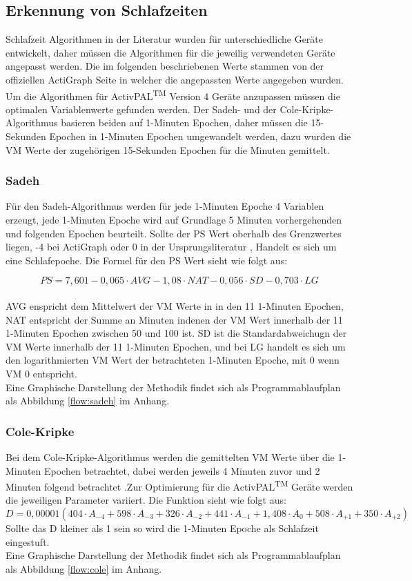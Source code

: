 \subsection{Erkennung von Schlafzeiten}
Schlafzeit Algorithmen in der Literatur wurden für unterschiedliche Geräte 
entwickelt, daher müssen die Algorithmen für die jeweilig verwendeten Geräte angepasst werden. Die im folgenden beschriebenen Werte stammen von der offiziellen ActiGraph Seite in welcher die angepassten Werte angegeben wurden. Um die Algorithmen für ActivPAL\textsuperscript{TM} Version 4 Geräte anzupassen müssen die optimalen Variablenwerte gefunden werden. Der Sadeh- und der Cole-Kripke-Algorithmus basieren beiden auf 1-Minuten Epochen, daher müssen die 15-Sekunden Epochen in 1-Minuten Epochen umgewandelt werden, dazu wurden die \ac{VM} Werte der zugehörigen 15-Sekunden Epochen für die Minuten gemittelt.



\subsubsection{Sadeh}
Für den Sadeh-Algorithmus werden für jede 1-Minuten Epoche 4 Variablen erzeugt, jede 1-Minuten Epoche wird auf Grundlage 5 Minuten vorhergehenden und folgenden Epochen beurteilt.
Sollte der \ac{PS} Wert oberhalb des Grenzwertes liegen, -4 bei ActiGraph oder 0 in der Ursprungsliteratur \cite{sadeh1994},  Handelt es sich um eine Schlafepoche. Die Formel für den \ac{PS} Wert sieht wie folgt aus:

$$ PS = 7,601 -  0,065 \cdot AVG - 1,08 \cdot NAT - 0,056 \cdot SD - 0,703 \cdot LG$$
\\
AVG enspricht dem Mittelwert der \ac{VM} Werte in in den 11 1-Minuten Epochen, NAT entspricht der Summe an Minuten indenen der \ac{VM} Wert innerhalb der 11 1-Minuten Epochen zwischen 50 und 100 ist. SD ist die Standardabweichugn der \ac{VM} Werte innerhalb der 11 1-Minuten Epochen, und bei LG handelt es sich um den logarithmierten \ac{VM} Wert der betrachteten 1-Minuten Epoche, mit 0 wenn \ac{VM} 0 entspricht.\\
Eine Graphische Darstellung der Methodik findet sich als Programmablaufplan als Abbildung \ref{flow:sadeh} im Anhang.



\subsubsection{Cole-Kripke}
Bei dem Cole-Kripke-Algorithmus werden die gemittelten \ac{VM} Werte über die 1-Minuten Epochen betrachtet, dabei werden jeweils 4 Minuten zuvor und 2 Minuten folgend betrachtet \cite{cole1992}.Zur Optimierung für die ActivPAL\textsuperscript{TM} Geräte werden die jeweiligen Parameter variiert. Die Funktion sieht wie folgt aus:
$$ D = 0,00001 (404 \cdot A_{-4} + 598 \cdot A_{-3} + 326 \cdot A_{-2} + 441 \cdot A_{-1} + 1,408 \cdot A_{0} + 508 \cdot A_{+1} + 350 \cdot A_{+2}) $$
Sollte das D kleiner als 1 sein so wird die 1-Minuten Epoche als Schlafzeit eingestuft.\\
Eine Graphische Darstellung der Methodik findet sich als Programmablaufplan als Abbildung \ref{flow:cole} im Anhang.


